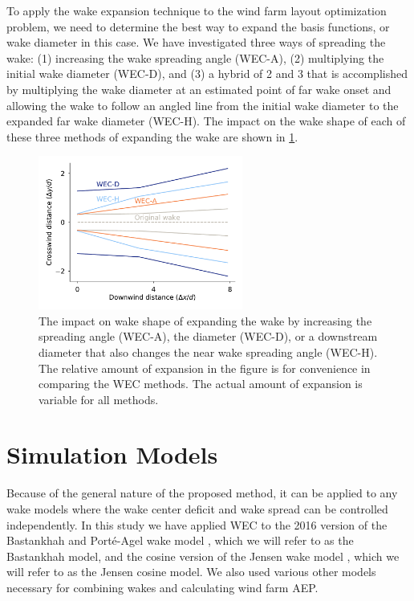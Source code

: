 \documentclass{jpconf}
\begin{document}
To apply the wake expansion technique to the wind farm layout optimization problem, we need to determine the best way to expand the basis functions, or wake diameter in this case. We have investigated three ways of spreading the wake: (1) increasing the wake spreading angle (WEC-A), (2) multiplying the initial wake diameter (WEC-D), and (3) a hybrid of 2 and 3 that is accomplished by multiplying the wake diameter at an estimated point of far wake onset and allowing the wake to follow an angled line from the initial wake diameter to the expanded far wake diameter (WEC-H). The impact on the wake shape of each of these three methods of expanding the wake are shown in \cref{fig:wec-methods}.

\begin{figure}[h]
	\centering
	\includegraphics[width=0.6\textwidth,trim={0, 0, 0, 2.0}]{wec-methods}
	\caption{The impact on wake shape of expanding the wake by increasing the spreading angle (WEC-A), the diameter (WEC-D), or a downstream diameter that also changes the near wake spreading angle (WEC-H). The relative amount of expansion in the figure is for convenience in comparing the WEC methods. The actual amount of expansion is variable for all methods.}
	\label{fig:wec-methods}
\end{figure}

\section{Simulation Models}\label{sec:models}
Because of the general nature of the proposed method, it can be applied to any wake models where the wake center deficit and wake spread can be controlled independently. In this study we have applied WEC to the 2016 version of the Bastankhah and Port\'e-Agel wake model \cite{bastankhah2016}, which we will refer to as the Bastankhah model, and the cosine version of the Jensen wake model \cite{jensen1983}, which we will refer to as the Jensen cosine model. We also used various other models necessary for combining wakes and calculating wind farm AEP.
\end{document}
